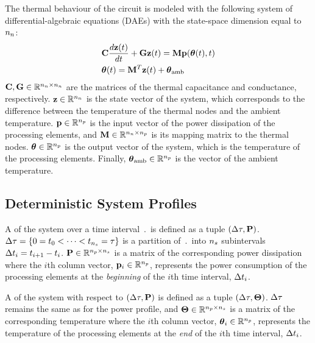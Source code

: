 The thermal behaviour of the circuit is modeled with the following system of differential-algebraic equations (DAEs) with the state-space dimension equal to ${n_n}$:
\begin{align}
  & \mC \frac{d\vTI(\t)}{d\t} + \mG \vTI(\t) = \mM \vP(\vTO(\t), \t) \elabel{fourier} \\
  & \vTO(\t) = \mM^T \vTI(\t) + \vTO_\amb \nonumber
\end{align}
$\mC, \mG \in \real^{\nodes \times \nodes}$ are the matrices of the thermal capacitance and conductance, respectively. $\vTI \in \real^\nodes$ is the state vector of the system, which corresponds to the difference between the temperature of the thermal nodes and the ambient temperature. $\vP \in \real^\cores$ is the input vector of the power dissipation of the processing elements, and $\mM \in \real^{\nodes \times \cores}$ is its mapping matrix to the thermal nodes. ${\boldsymbol\theta} \in \mathbb{R}^{n_p}$ is the output vector of the system, which is the temperature of the processing elements. Finally, ${\boldsymbol\theta}_{\text{amb}} \in \mathbb{R}^{n_p}$ is the vector of the ambient temperature.

\subsection{Deterministic System Profiles} 
A  of the system over a time interval $\period$ is defined as a tuple $\pP$. $\Delta \tau = \{ 0 = t_0 < \dots < t_{{n_s}} = \tau \}$ is a partition of $\period$ into ${n_s}$ subintervals $\Delta t_i = t_{i+1} - t_i$. $\mP \in \real^{\cores \times \steps}$ is a matrix of the corresponding power dissipation where the $i$th column vector, $\vP_i \in \real^\cores$, represents the power consumption of the processing elements at the \emph{beginning} of the $i$th time interval, $\Delta t_i$.

A  of the system with respect to $\pP$ is defined as a tuple $\pT$. $\Delta \tau$ remains the same as for the power profile, and $\mTO \in \real^{\cores \times \steps}$ is a matrix of the corresponding temperature where the $i$th column vector, ${\boldsymbol\theta}_i \in \mathbb{R}^{n_p}$, represents the temperature of the processing elements at the \emph{end} of the $i$th time interval, $\Delta t_i$.

